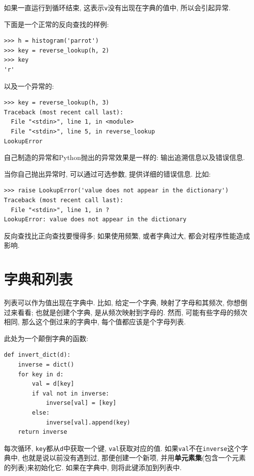 \documentclass[10pt]{book}
\begin{document}
如果一直运行到循环结束, 这表示{\tt v}没有出现在字典的值中, 
所以会引起异常. 

下面是一个正常的反向查找的样例:

\begin{verbatim}
>>> h = histogram('parrot')
>>> key = reverse_lookup(h, 2)
>>> key
'r'
\end{verbatim}
%
以及一个异常的:

\begin{verbatim}
>>> key = reverse_lookup(h, 3)
Traceback (most recent call last):
  File "<stdin>", line 1, in <module>
  File "<stdin>", line 5, in reverse_lookup
LookupError
\end{verbatim}
%
自己制造的异常和Python抛出的异常效果是一样的:
输出追溯信息以及错误信息. 

当你自己抛出异常时, 可以通过可选参数, 提供详细的错误信息. 比如:

\begin{verbatim}
>>> raise LookupError('value does not appear in the dictionary')
Traceback (most recent call last):
  File "<stdin>", line 1, in ?
LookupError: value does not appear in the dictionary
\end{verbatim}
%
反向查找比正向查找要慢得多;
如果使用频繁, 或者字典过大, 都会对程序性能造成影响. 


\section{字典和列表}
\label{invert}

列表可以作为值出现在字典中. 比如, 给定一个字典, 映射了字母和其频次, 
你想倒过来看看; 也就是创建个字典, 是从频次映射到字母的. 
然而, 可能有些字母的频次相同, 那么这个倒过来的字典中, 每个值都应该是个字母列表. 

此处为一个颠倒字典的函数:

\begin{verbatim}
def invert_dict(d):
    inverse = dict()
    for key in d:
        val = d[key]
        if val not in inverse:
            inverse[val] = [key]
        else:
            inverse[val].append(key)
    return inverse
\end{verbatim}
%
每次循环, {\tt key}都从{\tt d}中获取一个键, {\tt val}获取对应的值. 
如果{\tt val}不在{\tt inverse}这个字典中, 也就是说以前没有遇到过, 
那便创建一个新项, 并用{\bf 单元素集}(包含一个元素的列表)来初始化它. 
如果在字典中, 则将此键添加到列表中. 
\end{document}
